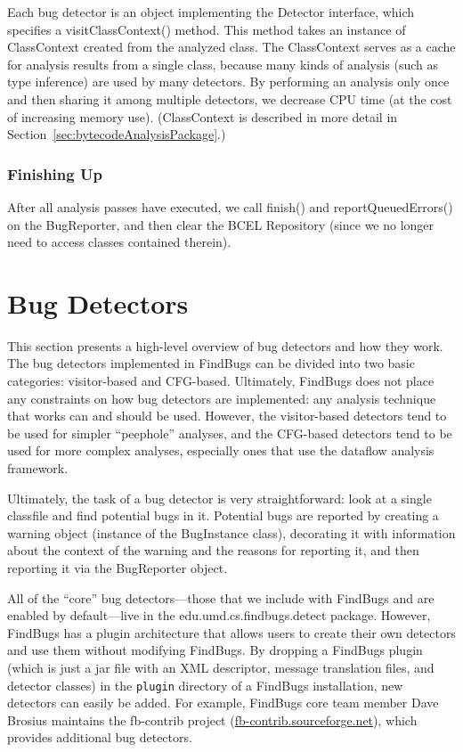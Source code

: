 \documentclass[11pt]{article}
\begin{document}
Each bug detector is an object implementing the Detector interface,
which specifies a visitClassContext() method.  This method takes
an instance of ClassContext created from the analyzed class.  The ClassContext serves
as a cache for analysis results from a single class, because many
kinds of analysis (such as type inference) are used by many detectors.
By performing an analysis only once and then sharing it among multiple
detectors, we decrease CPU time (at the cost of increasing memory use).
(ClassContext is described in more detail in Section~\ref{sec:bytecodeAnalysisPackage}.)

\subsubsection{Finishing Up}

After all analysis passes have executed, we call finish() and
reportQueuedErrors() on the BugReporter, and then clear the BCEL Repository
(since we no longer need to access classes contained therein).

\section{Bug Detectors}

This section presents a high-level overview of bug detectors and
how they work.  The bug detectors implemented in FindBugs can be divided into
two basic categories: visitor-based and CFG-based.  Ultimately, FindBugs
does not place any constraints on how bug detectors are implemented:
any analysis technique that works can and should be used.  However,
the visitor-based detectors tend to be used for simpler ``peephole''
analyses, and the CFG-based detectors tend to be used for more
complex analyses, especially ones that use the dataflow analysis
framework.

Ultimately, the task of a bug detector is very straightforward:
look at a single classfile and find potential bugs in it.
Potential bugs are reported by creating a warning object (instance
of the BugInstance class), decorating it with information about
the context of the warning and the reasons for reporting it,
and then reporting it via the BugReporter object.

All of the ``core'' bug detectors---those that we include with FindBugs
and are enabled by default---live in the edu.umd.cs.findbugs.detect
package.  However, FindBugs has a plugin architecture that allows users
to create their own detectors and use them without modifying FindBugs.
By dropping a FindBugs plugin (which is just a jar file with an XML descriptor,
message translation files, and detector classes) in the
{\tt plugin} directory of a FindBugs installation, new detectors can
easily be added.  For example, FindBugs core team member Dave Brosius maintains
the fb-contrib project (\url{fb-contrib.sourceforge.net}), which
provides additional bug detectors.
\end{document}
